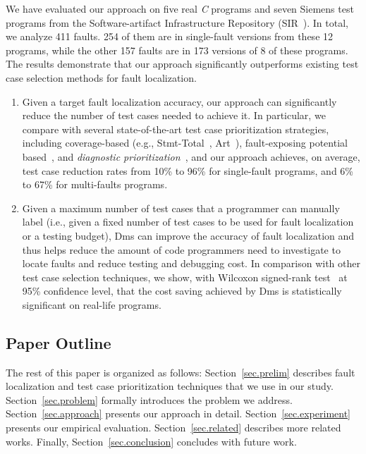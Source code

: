 We have evaluated our approach on five real {\em C} programs and seven Siemens test programs from the Software-artifact Infrastructure Repository (SIR~\citep{doESE05}).
In total, we analyze 411 faults. 254 of them are in single-fault versions from these 12 programs, while the other 157 faults are in 173 versions of 8 of these programs.
The results demonstrate that our approach significantly outperforms existing test case selection methods for fault localization.

\begin{enumerate}
	\setlength{\parskip}{0pt}%
    \setlength{\itemsep}{3pt}%
	\item Given a target fault localization accuracy, our approach can significantly reduce the number of test cases needed to achieve it. In particular, we compare with several state-of-the-art test case prioritization strategies, including coverage-based (e.g., {\sc Stmt-Total}~\citep{RUCH01,SEAGMGR01}, {\sc Art}~\citep{JiangZCT09}), fault-exposing potential based~\citep{RUCH01}, and {\em diagnostic prioritization}~\citep{Alberto2011,Gonzalez-SanchezPAGG11,JiangCT11}, and our approach achieves, on average, test case reduction rates from
10\% to 96\% for single-fault programs, and 6\% to 67\% for multi-faults programs.
	\item Given a maximum number of test cases that a programmer can manually label (i.e., given a fixed number of test cases to be used for fault localization or a testing budget), {\sc Dms} can improve the accuracy of fault localization and thus helps reduce the amount of code programmers need to investigate to locate faults and reduce testing and debugging cost. In comparison with other test case selection techniques, we show, with Wilcoxon signed-rank test~\citep{WF1943} at 95\% confidence level, that the cost saving achieved by {\sc Dms} is statistically significant on real-life programs.
\end{enumerate}

\subsection{Paper Outline}

The rest of this paper is organized as follows: Section~\ref{sec.prelim} describes fault localization and test case prioritization techniques that we use in our study. Section~\ref{sec.problem} formally introduces the problem we address. Section~\ref{sec.approach} presents our approach in detail. Section~\ref{sec.experiment} presents our empirical evaluation. Section~\ref{sec.related} describes more related works.
Finally, Section~\ref{sec.conclusion} concludes with future work.
